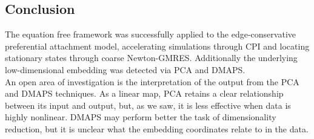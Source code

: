 \documentclass[epjST, final]{svjour}
\begin{document}
\begin{onehalfspace}
\section{Conclusion}

The equation free framework was successfully applied to the edge-conservative preferential attachment model, accelerating simulations through CPI and locating stationary states through coarse Newton-GMRES. Additionally the underlying low-dimensional embedding was detected via PCA and DMAPS. \\

An open area of investigation is the interpretation of the output from the PCA and DMAPS techniques. As a linear map, PCA retains a clear relationship between its input and output, but, as we saw, it is less effective when data is highly nonlinear. DMAPS may perform better the task of dimensionality reduction, but it is unclear what the embedding coordinates relate to in the data.


 




\end{onehalfspace}



\end{document}
